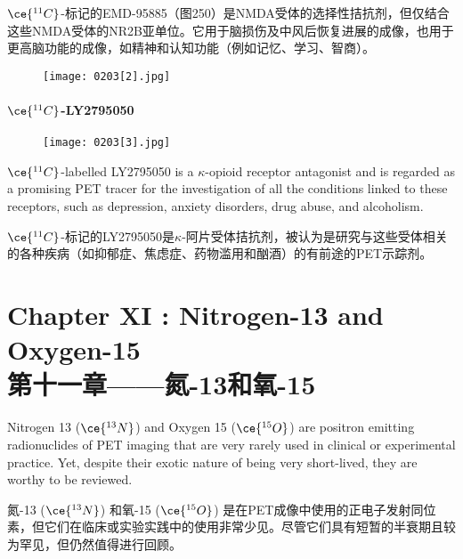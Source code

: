 \documentclass[dvipsnames, svgnames,a4paper,11pt]{article}
\begin{document}
\(\ce{^{11}C}\)-标记的EMD-95885（图250）是NMDA受体的选择性拮抗剂，但仅结合这些NMDA受体的NR2B亚单位。它用于脑损伤及中风后恢复进展的成像，也用于更高脑功能的成像，如精神和认知功能（例如记忆、学习、智商）。

\begin{figure}[h]
	\centering
    \texttt{[image: 0203[2].jpg]}  
     \label{fig250}
\end{figure}

\paragraph{\(\ce{^{11}C}\)-LY2795050}  

\begin{wrapfigure}{r}{0.4\textwidth}
    \centering
    \texttt{[image: 0203[3].jpg]}
     \label{fig251}
\end{wrapfigure}

\(\ce{^{11}C}\)-labelled LY2795050 is a \(\kappa\)-opioid receptor antagonist and is regarded as a promising PET tracer for the investigation of all the conditions linked to these receptors, such as depression, anxiety disorders, drug abuse, and alcoholism.

\(\ce{^{11}C}\)-标记的LY2795050是\(\kappa\)-阿片受体拮抗剂，被认为是研究与这些受体相关的各种疾病（如抑郁症、焦虑症、药物滥用和酗酒）的有前途的PET示踪剂。

\newpage


\section{Chapter XI :   Nitrogen-13 and Oxygen-15 \\第十一章——氮-13和氧-15}

Nitrogen 13 (\(\ce{^{13}N}\)) and Oxygen 15 (\(\ce{^{15}O}\)) are positron emitting radionuclides of PET imaging that are very rarely used in clinical or experimental practice. Yet, despite their exotic nature of being very short-lived, they are worthy to be reviewed.

氮-13 (\(\ce{^{13}N}\)) 和氧-15 (\(\ce{^{15}O}\)) 是在PET成像中使用的正电子发射同位素，但它们在临床或实验实践中的使用非常少见。尽管它们具有短暂的半衰期且较为罕见，但仍然值得进行回顾。
\end{document}
